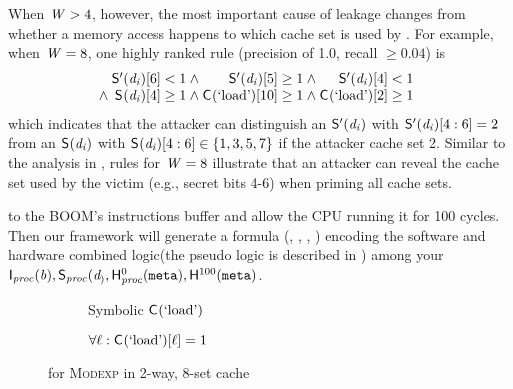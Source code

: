 When $\mathit{W}>4$, however, the most important cause of leakage changes
from whether a memory access happens to which cache set is used by
\privK{\modexpRound}. For example, when $\mathit{W}=8$, one highly ranked
rule (precision of 1.0, recall $\ge 0.04$) is
\begin{align*}
\begin{array}{@{}r@{\hspace{0.25em}}r@{\hspace{0.25em}}r@{\hspace{0.25em}}r@{\hspace{0.25em}}r@{\hspace{0.25em}}r}
& \SecFnAlt{}(\privK{\modexpRound})[6]< 1 & \wedge
& \SecFnAlt{}(\privK{\modexpRound})[5]\ge 1 & \wedge
& \SecFnAlt{}(\privK{\modexpRound})[4]< 1\\
  \wedge & \SecFn{}(\privK{\modexpRound})[4]\ge 1 & \wedge & \ACIFn{}(\loadVar)[10]\ge 1 & \wedge & \ACIFn{}(\loadVar)[2]\ge 1
\end{array}
\end{align*}
which indicates that the attacker can distinguish an
$\mathsf{S}'_{}(\mathit{d_{i}})$ with
$\mathsf{S}'_{}(\mathit{d_{i}})[4:6]=2$ from an
$\mathsf{S}_{}(\mathit{d_{i}})$ with
$\mathsf{S}_{}(\mathit{d_{i}})[4:6] \in \{1,3,5,7\}$ if the attacker
 cache set 2. Similar to the analysis in
, rules for $\mathit{W}=8$
illustrate that an attacker can reveal the cache set used by the
victim (e.g., secret bits 4-6) when priming all cache sets.

to the BOOM's instructions buffer and allow the CPU running it for 100
cycles. Then our framework will generate a formula
(\ACIFn{}, \AIIFn{}, \SecFn{}, \HwFn{}{})
encoding the software and hardware combined logic(the pseudo logic is
described in ) among your
$\mathsf{I}_{\mathit{proc}}(\mathit{b}),\mathsf{S}_{\mathit{proc}}(\mathit{d_{)}},\mathsf{H}_{\mathit{proc}}^{0}(\texttt{meta}),
\mathsf{H}_{}^{100}(\texttt{meta})$. 
\fi

\begin{figure}
\begin{subfigure}{0.495\linewidth}
\resizebox{\linewidth}{!}{\protect\small}
\caption{Symbolic $\mathsf{C}_{}(\textrm{`load'})$}
\label{fig:modexp:jaccard:sym}
\end{subfigure}%
\begin{subfigure}{0.495\linewidth}
\resizebox{\linewidth}{!}{\protect\small}
\caption{$\forall \ell: \mathsf{C}_{}(\textrm{`load'})[\ell] = 1$}
\label{fig:modexp:jaccard:prime}
\end{subfigure}%
\caption{\JaccardRand{\secretsSetSize} for \textsc{Modexp} in 2-way, 8-set cache}
\end{figure}

